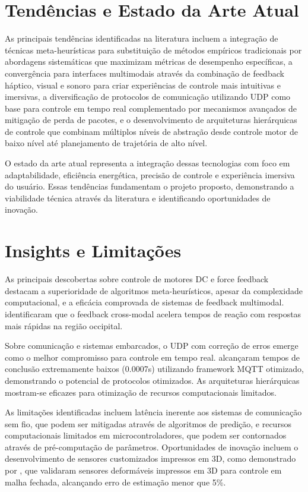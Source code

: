 \section{Tendências e Estado da Arte Atual}
\label{sec:tendencias-estado-arte}

As principais tendências identificadas na literatura incluem a integração de técnicas meta-heurísticas para substituição de métodos empíricos tradicionais por abordagens sistemáticas que maximizam métricas de desempenho específicas, a convergência para interfaces multimodais através da combinação de feedback háptico, visual e sonoro para criar experiências de controle mais intuitivas e imersivas, a diversificação de protocolos de comunicação utilizando UDP como base para controle em tempo real complementado por mecanismos avançados de mitigação de perda de pacotes, e o desenvolvimento de arquiteturas hierárquicas de controle que combinam múltiplos níveis de abstração desde controle motor de baixo nível até planejamento de trajetória de alto nível.

O estado da arte atual representa a integração dessas tecnologias com foco em adaptabilidade, eficiência energética, precisão de controle e experiência imersiva do usuário. Essas tendências fundamentam o projeto proposto, demonstrando a viabilidade técnica através da literatura e identificando oportunidades de inovação.

\section{Insights e Limitações}
\label{sec:insights-limitacoes}

As principais descobertas sobre controle de motores DC e force feedback destacam a superioridade de algoritmos meta-heurísticos, apesar da complexidade computacional, e a eficácia comprovada de sistemas de feedback multimodal.  identificaram que o feedback cross-modal acelera tempos de reação com respostas mais rápidas na região occipital.

Sobre comunicação e sistemas embarcados, o UDP com correção de erros emerge como o melhor compromisso para controle em tempo real.  alcançaram tempos de conclusão extremamente baixos (0.0007s) utilizando framework MQTT otimizado, demonstrando o potencial de protocolos otimizados. As arquiteturas hierárquicas mostram-se eficazes para otimização de recursos computacionais limitados.

As limitações identificadas incluem latência inerente aos sistemas de comunicação sem fio, que podem ser mitigadas através de algoritmos de predição, e recursos computacionais limitados em microcontroladores, que podem ser contornados através de pré-computação de parâmetros. Oportunidades de inovação incluem o desenvolvimento de sensores customizados impressos em 3D, como demonstrado por , que validaram sensores deformáveis impressos em 3D para controle em malha fechada, alcançando erro de estimação menor que 5\%.

